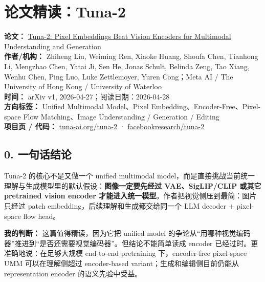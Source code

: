 
\section{论文精读：Tuna-2}

\begin{conceptbox}
\textbf{论文：} \href{https://arxiv.org/abs/2604.24763}{Tuna-2: Pixel Embeddings Beat Vision Encoders for Multimodal Understanding and Generation}\\
\textbf{作者/机构：} Zhiheng Liu, Weiming Ren, Xiaoke Huang, Shoufa Chen, Tianhong Li, Mengzhao Chen, Yatai Ji, Sen He, Jonas Schult, Belinda Zeng, Tao Xiang, Wenhu Chen, Ping Luo, Luke Zettlemoyer, Yuren Cong；Meta AI / The University of Hong Kong / University of Waterloo\\
\textbf{时间：} arXiv v1, 2026-04-27；阅读日期：2026-04-28\\
\textbf{方向标签：} Unified Multimodal Model、Pixel Embedding、Encoder-Free、Pixel-space Flow Matching、Image Understanding / Generation / Editing\\
\textbf{项目页 / 代码：} \href{https://tuna-ai.org/tuna-2/}{tuna-ai.org/tuna-2} · \href{https://github.com/facebookresearch/tuna-2}{facebookresearch/tuna-2}
\end{conceptbox}

\subsection{0. 一句话结论}

Tuna-2 的核心不是又做一个 unified multimodal model，而是直接挑战当前统一理解与生成模型里的默认假设：\textbf{图像一定要先经过 VAE、SigLIP/CLIP 或其它 pretrained vision encoder 才能进入统一模型}。作者把视觉侧压到最简：图片只经过 patch embedding，后续理解和生成都交给同一个 LLM decoder + pixel-space flow head。

\begin{summarybox}
\textbf{我的判断：} 这篇值得精读，因为它把 unified model 的争论从“用哪种视觉编码器”推进到“是否还需要视觉编码器”。但结论不能简单读成 encoder 已经过时。更准确地说：在足够大规模 end-to-end pretraining 下，encoder-free pixel-space UMM 可以在理解侧超过 encoder-based variant；生成和编辑侧目前仍能从 representation encoder 的语义先验中受益。
\end{summarybox}

